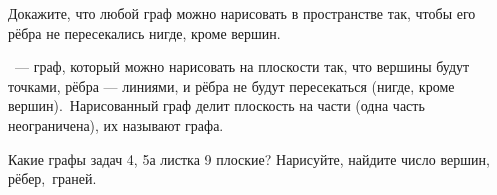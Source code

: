 \documentclass[12pt,a4paper]{article}
\begin{document}


\thispagestyle{empty}


\vspace*{1mm}



Докажите, что любой граф можно нарисовать в пространстве так,
чтобы его рёбра не пересекались нигде, кроме вершин.

 \ --- граф, который можно нарисовать
на плоскости так, что вершины будут точками, рёбра --- линиями, и рёбра не будут пересекаться (нигде, кроме вершин).~Нарисован\-ный граф делит плоскость на части (одна часть неограничена), их называют  графа.

Какие графы задач 4, 5а листка 9 плоские? Нарисуйте, найдите число вершин, рёбер,~граней.
\end{document}

